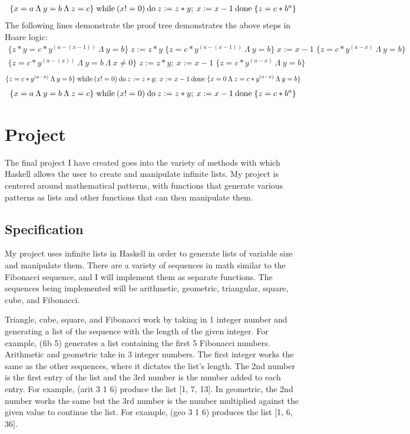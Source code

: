 \documentclass{article}
\theoremstyle{theorem}
\theoremstyle{definition}
\theoremstyle{remark}
\begin{document}
\begin{align*}
\{x = a \: \Lambda \: y = b \: \Lambda \: z = c\} \; {\rm while} \: (x!=0) \: {\rm do} \: z:=z*y; \: x:= x-1 \: {\rm done} \; \{z = c * b^a\}
\end{align*}
%
The following lines demonstrate the proof tree demonstrates the above steps in Hoare logic:
\begin{align*}
\{z*y = c * y^{(a - (x-1))} \: \Lambda \: y = b\} \; z:= z*y \; \{z = c * y^{(a - (x-1))} \: \Lambda \: y = b\} \; x:=x-1 \; \{z =c * y^{(a - x)} \: \Lambda \: y = b\}
\end{align*}
\begin{align*}
\{z = c * y^{(a - (x))} \: \Lambda \: y = b \: \Lambda \: x \neq 0\} \; z:= z*y; \: x:=x-1 \;  \{z =c * y^{(a - x)} \: \Lambda \: y = b\}
\end{align*}
\begin{align*}
 \{z =c * y^{(a - x)} \: \Lambda \: y = b\} \; {\rm while} \: (x!=0) \: {\rm do} \: z:=z*y; \: x:= x-1 \: {\rm done} \; \{x=0 \: \Lambda \: z =c * y^{(a - x)} \: \Lambda \: y = b\}
\end{align*}
\begin{align*}
\{x = a \: \Lambda \: y = b \: \Lambda \: z = c\} \; {\rm while} \: (x!=0) \: {\rm do} \: z:=z*y; \: x:= x-1 \: {\rm done} \; \{z = c * b^a\}
\end{align*}

\section{Project}

The final project I have created goes into the variety of methods with which Haskell allows the user to create and manipulate infinite lists. My project is centered around mathematical patterns, with functions that generate various patterns as lists and other functions that can then manipulate them.

\subsection{Specification}
My project uses infinite lists in Haskell in order to generate lists of variable size and manipulate them. There are a variety of sequences in math similar to the Fibonacci sequence, and I will implement them as separate functions. The sequences being implemented will be arithmetic, geometric, triangular, square, cube, and Fibonacci.

\medskip\noindent
Triangle, cube, square, and Fibonacci work by taking in 1 integer number and generating a list of the sequence with the length of the given integer. For example, (fib 5) generates a list containing the first 5 Fibonacci numbers. Arithmetic and geometric take in 3 integer numbers. The first integer works the same as the other sequences, where it dictates the list's length. The 2nd number is the first entry of the list and the 3rd number is the number added to each entry. For example, (arit 3 1 6) produce the list [1, 7, 13]. In geometric, the 2nd number works the same but the 3rd number is the number multiplied against the given value to continue the list. For example, (geo 3 1 6) produces the list [1, 6, 36].
\end{document}
